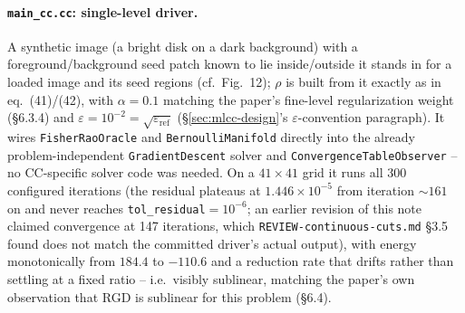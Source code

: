 \documentclass[11pt]{article}
\begin{document}
\paragraph{\texttt{main\_cc.cc}: single-level driver.} A synthetic image (a bright disk on
a dark background) with a foreground/background seed patch known to lie inside/outside it
stands in for a loaded image and its seed regions (cf.\ Fig.~12); $\rho$ is built from it
exactly as in eq.~(41)/(42), with $\alpha=0.1$ matching the paper's fine-level regularization
weight (\S 6.3.4) and $\varepsilon=10^{-2}=\sqrt{\varepsilon_{\text{ref}}}$
(\S\ref{sec:mlcc-design}'s $\varepsilon$-convention paragraph). It wires
\texttt{FisherRaoOracle} and \texttt{BernoulliManifold} directly into the already
problem-independent \texttt{GradientDescent} solver and \texttt{ConvergenceTableObserver} --
no CC-specific solver code was needed. On a $41\times41$ grid it runs all 300 configured
iterations (the residual plateaus at $1.446\times10^{-5}$ from iteration $\sim\!161$ on and
never reaches \texttt{tol\_residual}$=10^{-6}$; an earlier revision of this note claimed
convergence at 147 iterations, which \texttt{REVIEW-continuous-cuts.md} \S3.5 found does not
match the committed driver's actual output), with energy monotonically from $184.4$ to
$-110.6$ and a reduction rate that drifts rather than settling at a fixed ratio -- i.e.\ visibly
sublinear, matching the paper's own observation that RGD is sublinear for this problem
(\S 6.4).
\end{document}
